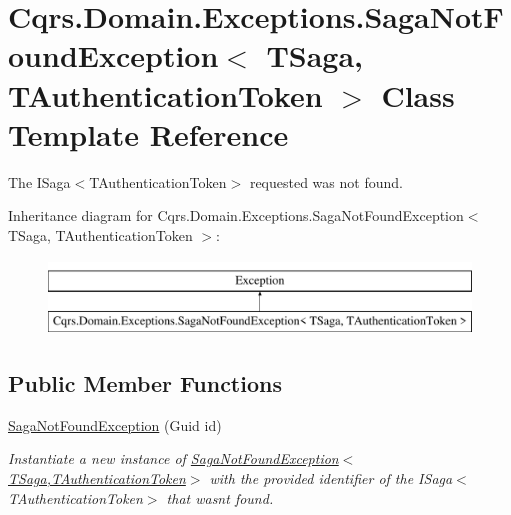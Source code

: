 \hypertarget{classCqrs_1_1Domain_1_1Exceptions_1_1SagaNotFoundException}{}\section{Cqrs.\+Domain.\+Exceptions.\+Saga\+Not\+Found\+Exception$<$ T\+Saga, T\+Authentication\+Token $>$ Class Template Reference}
\label{classCqrs_1_1Domain_1_1Exceptions_1_1SagaNotFoundException}


The I\+Saga$<$\+T\+Authentication\+Token$>$ requested was not found.  


Inheritance diagram for Cqrs.\+Domain.\+Exceptions.\+Saga\+Not\+Found\+Exception$<$ T\+Saga, T\+Authentication\+Token $>$\+:\begin{figure}[H]
\begin{center}
\leavevmode
\includegraphics[height=2.000000cm]{classCqrs_1_1Domain_1_1Exceptions_1_1SagaNotFoundException}
\end{center}
\end{figure}
\subsection*{Public Member Functions}
\begin{DoxyCompactItemize}
\item 
\hyperlink{classCqrs_1_1Domain_1_1Exceptions_1_1SagaNotFoundException_a329725b9034ccf3167b667383fb8718a_a329725b9034ccf3167b667383fb8718a}{Saga\+Not\+Found\+Exception} (Guid id)
\begin{DoxyCompactList}\small\item\em Instantiate a new instance of \hyperlink{classCqrs_1_1Domain_1_1Exceptions_1_1SagaNotFoundException_a329725b9034ccf3167b667383fb8718a_a329725b9034ccf3167b667383fb8718a}{Saga\+Not\+Found\+Exception$<$\+T\+Saga,\+T\+Authentication\+Token$>$} with the provided identifier of the I\+Saga$<$\+T\+Authentication\+Token$>$ that wasn\textquotesingle{}t found. \end{DoxyCompactList}\end{DoxyCompactItemize}


